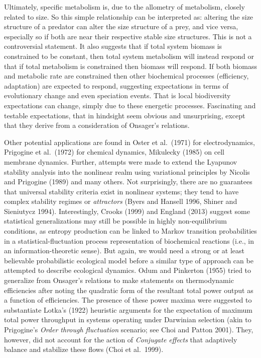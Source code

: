 \documentclass[11pt,letterpaper,]{paper}
\begin{document}
Ultimately, specific metabolism is, due to the allometry of metabolism,
closely related to size. So this simple relationship can be interpreted
as: altering the size structure of a predator can alter the size
structure of a prey, and vice versa, especially so if both are near
their respective stable size structures. This is not a controversial
statement. It also suggests that if total system biomass is constrained
to be constant, then total system metabolism will instead respond or
that if total metabolism is constrained then biomass will respond. If
both biomass and metabolic rate are constrained then other biochemical
processes (efficiency, adaptation) are expected to respond, suggesting
expectations in terms of evolutionary change and even speciation events.
That is local biodiversity expectations can change, simply due to these
energetic processes. Fascinating and testable expectations, that in
hindsight seem obvious and unsurprising, except that they derive from a
consideration of Onsager's relations.

Other potential applications are found in Oster et al.~(1971) for
electrodynamics, Prigogine et al.~(1972) for chemical dynamics,
Mikulecky (1985) on cell membrane dynamics. Further, attempts were made
to extend the Lyapunov stability analysis into the nonlinear realm using
variational principles by Nicolis and Prigogine (1989) and many others.
Not surprisingly, there are no guarantees that universal stability
criteria exist in nonlinear systems; they tend to have complex stability
regimes or \emph{attractors} (Byers and Hansell 1996, Shiner and
Sieniutycz 1994). Interestingly, Crooks (1999) and England (2013)
suggest some statistical generalizations may still be possible in highly
non-equilibrium conditions, as entropy production can be linked to
Markov transition probabilities in a statistical-fluctuation process
representation of biochemical reactions (i.e., in an
information-theoretic sense). But again, we would need a strong or at
least believable probabilistic ecological model before a similar type of
approach can be attempted to describe ecological dynamics. Odum and
Pinkerton (1955) tried to generalize from Onsager's relations to make
statements on thermodynamic efficiencies after noting the quadratic form
of the resultant total power output as a function of efficiencies. The
presence of these power maxima were suggested to substantiate Lotka's
(1922) heuristic arguments for the expectation of maximum total power
throughput in systems operating under Darwinian selection (akin to
Prigogine's \emph{Order through fluctuation} scenario; see Choi and
Patton 2001). They, however, did not account for the action of
\emph{Conjugate effects} that adaptively balance and stabilize these
flows (Choi et al.~1999).
\end{document}
